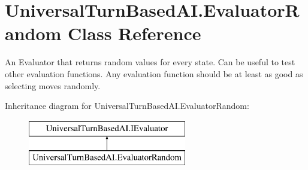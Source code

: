 \hypertarget{class_universal_turn_based_a_i_1_1_evaluator_random}{}\section{Universal\+Turn\+Based\+A\+I.\+Evaluator\+Random Class Reference}
\label{class_universal_turn_based_a_i_1_1_evaluator_random}


An Evaluator that returns random values for every state. Can be useful to test other evaluation functions. Any evaluation function should be at least as good as selecting moves randomly.  


Inheritance diagram for Universal\+Turn\+Based\+A\+I.\+Evaluator\+Random\+:\begin{figure}[H]
\begin{center}
\leavevmode
\includegraphics[height=2.000000cm]{class_universal_turn_based_a_i_1_1_evaluator_random}
\end{center}
\end{figure}
